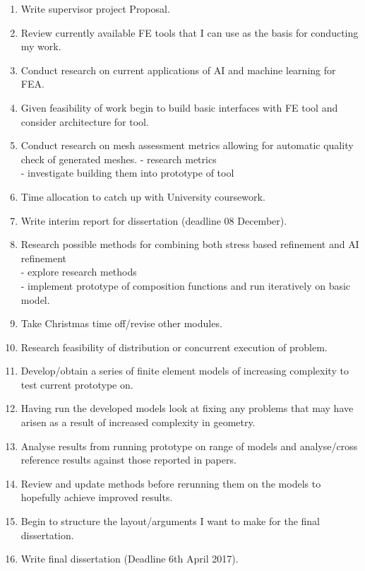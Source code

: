 \begin{enumerate}[label=\Alph*]
\item Write supervisor project Proposal.
\item Review currently available FE tools that I can use as the basis for conducting my work.
\item Conduct research on current applications of AI and machine learning for FEA.
\item Given feasibility of work begin to build basic interfaces with FE tool and consider architecture for tool.
\item Conduct research on mesh assessment metrics allowing for automatic quality check of generated meshes.
- research metrics\\
- investigate building them into prototype of tool
\item Time allocation to catch up with University coursework.
\item Write interim report for dissertation (deadline 08 December).
\item Research possible methods for combining both stress based refinement and AI refinement\\
- explore research methods\\
- implement prototype of composition functions and run iteratively on basic model.
\item Take Christmas time off/revise other modules.
\item Research feasibility of distribution or concurrent execution of problem.
\item Develop/obtain a series of finite element models of increasing complexity to test current prototype on.
\item Having run the developed models look at fixing any problems that may have arisen as a result of increased complexity in geometry.
\item Analyse results from running prototype on range of models and analyse/cross reference results against those reported in papers.
\item Review and update methods before rerunning  them on the models to hopefully achieve improved results.
\item Begin to structure the layout/arguments I want to make for the final dissertation.
\item Write final dissertation (Deadline 6th April 2017).
\end{enumerate}
\pagestyle{empty}

